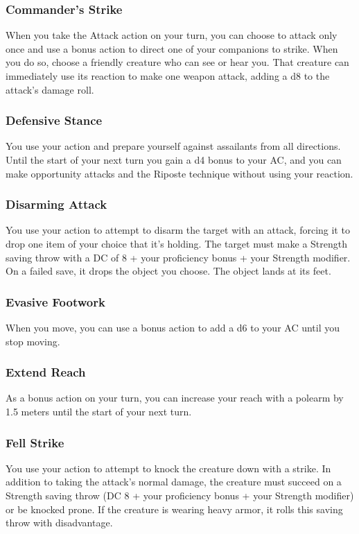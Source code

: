 \subsubsection{Commander's Strike} \label{tec::commandersstrike}
When you take the Attack action on your turn, you can choose to attack only once and use a bonus action to direct one of your companions to strike.
When you do so, choose a friendly creature who can see or hear you.
That creature can immediately use its reaction to make one weapon attack, adding a d8 to the attack's damage roll.

\subsubsection{Defensive Stance} \label{tec::defensivestance}
You use your action and prepare yourself against assailants from all directions.
Until the start of your next turn you gain a d4 bonus to your AC, and you can make opportunity attacks and the Riposte technique without using your reaction.

\subsubsection{Disarming Attack} \label{tec::disarmingattack}
You use your action to attempt to disarm the target with an attack, forcing it to drop one item of your choice that it's holding.
The target must make a Strength saving throw with a DC of 8 + your proficiency bonus + your Strength modifier.
On a failed save, it drops the object you choose.
The object lands at its feet.

\subsubsection{Evasive Footwork} \label{tec::evasivefootwork}
When you move, you can use a bonus action to add a d6 to your AC until you stop moving.

\subsubsection{Extend Reach} \label{tec::extendreach}
As a bonus action on your turn, you can increase your reach with a polearm by 1.5 meters until the start of your next turn.

\subsubsection{Fell Strike} \label{tec::fellstrike}
You use your action to attempt to knock the creature down with a strike.
In addition to taking the attack's normal damage, the creature must succeed on a Strength saving throw (DC 8 + your proficiency bonus + your Strength modifier) or be knocked prone.
If the creature is wearing heavy armor, it rolls this saving throw with disadvantage.


